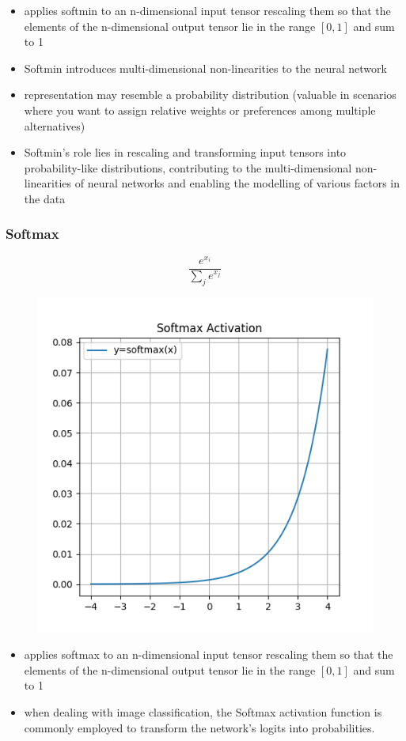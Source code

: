 \documentclass[11pt]{article}
\begin{document}
\begin{itemize}
    \item applies softmin to an n-dimensional input tensor rescaling them so that the elements of the n-dimensional output tensor lie in the range $[0,1]$ and sum to 1
    \item Softmin introduces multi-dimensional non-linearities to the neural network
    \item representation may resemble a probability distribution (valuable in scenarios where you want to assign relative weights or preferences among multiple alternatives)
    \item Softmin's role lies in rescaling and transforming input tensors into probability-like distributions, contributing to the multi-dimensional non-linearities of neural networks and enabling the modelling of various factors in the data
\end{itemize}

\subsubsection{Softmax}

\begin{definition}\label{eq:activation-softmax}
    \begin{equation*}
        \frac{e^{x_i}}{\sum_j e^{x_j}}
    \end{equation*}
\end{definition}

\begin{figure}[H]
    \centering
    \includegraphics*[width=.4\linewidth]{figures/Softmax Activation.png}\label{fig:softmax}
\end{figure}

\begin{itemize}
    \item applies softmax to an n-dimensional input tensor rescaling them so that the elements of the n-dimensional output tensor lie in the range $[0,1]$ and sum to 1
    \item when dealing with image classification, the Softmax activation function is commonly employed to transform the network's logits into probabilities.
\end{itemize}
\end{document}

